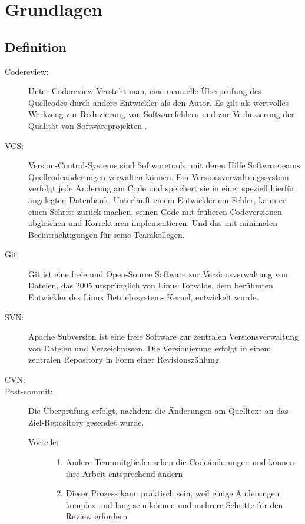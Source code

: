 \section{Grundlagen}
\label{sec:Grundlagen}

\subsection{Definition}
\label{subsec:Definition}

\begin{description}
	\item [Codereview:]
		Unter Codereview Versteht man, eine manuelle Überprüfung des Quellcodes durch andere Entwickler als den Autor. Es gilt als wertvolles Werkzeug zur Reduzierung von 							Softwarefehlern und zur Verbesserung der Qualität von Softwareprojekten \cite{bacchelli2013expectations}.

	\item [VCS:]
		Version-Control-Systeme sind Softwaretools, mit deren Hilfe Softwareteams Quellcodeänderungen verwalten können. Ein Versionsverwaltungssystem verfolgt jede Änderung am Code und 			speichert sie in einer speziell hierfür angelegten Datenbank. Unterläuft einem Entwickler ein Fehler, kann er einen Schritt zurück machen, seinen Code mit früheren Codeversionen 		abgleichen und Korrekturen implementieren. Und das mit minimalen Beeinträchtigungen für seine Teamkollegen.\cite{Bitbucket}

	\item [Git:]
		Git ist eine freie und Open-Source Software zur Versionsverwaltung von Dateien, das 2005 ursprünglich von Linus Torvalds, dem berühmten Entwickler des Linux Betriebssystem-				Kernel, entwickelt wurde.
	
	\item [SVN:]
		Apache Subversion ist eine freie Software zur zentralen Versionsverwaltung von Dateien und Verzeichnissen. Die Versionierung erfolgt in einem zentralen Repository in Form einer  			Revisionszählung.
	
	\item [CVN:]
	
	\item [Post-commit:]
		Die Überprüfung erfolgt, nachdem die Änderungen am Quelltext an das Ziel-Repository gesendet wurde.
		\begin{description}
			\item [Vorteile:] \hfill
			\begin{enumerate}
				\item Andere Teammitglieder sehen die Codeänderungen und können ihre Arbeit entsprechend ändern
				\item Dieser Prozess kann praktisch sein, weil einige Änderungen komplex und lang sein können und mehrere Schritte für den Review erfordern
			\end{enumerate}
			

\end{description}
\end{description}
